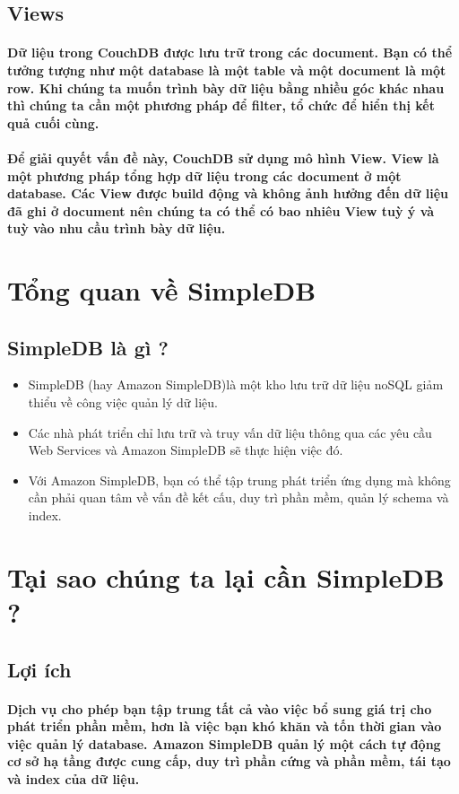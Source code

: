 		\subsection{Views}
			\paragraph{Dữ liệu trong CouchDB được lưu trữ trong các document. Bạn có thể tưởng tượng như một database là một table và một document là một row. Khi chúng ta muốn trình bày dữ liệu bằng nhiều góc khác nhau thì chúng ta cần một phương pháp để filter, tổ chức để hiển thị kết quả cuối cùng.}
			\paragraph{Để giải quyết vấn đề này, CouchDB sử dụng mô hình View. View là một phương pháp tổng hợp dữ liệu trong các document ở một database. Các View được build động và không ảnh hưởng đến dữ liệu đã ghi ở document nên chúng ta có thể có bao nhiêu View tuỳ ý và tuỳ vào nhu cầu trình bày dữ liệu.}
\section{Tổng quan về SimpleDB}
	\subsection{SimpleDB là gì ?}
		\begin{itemize}
			\item SimpleDB (hay Amazon SimpleDB)là một kho lưu trữ dữ liệu noSQL giảm thiểu về công việc quản lý dữ liệu.
			\item Các nhà phát triển chỉ lưu trữ và truy vấn dữ liệu thông qua các yêu cầu Web Services và Amazon SimpleDB sẽ thực hiện việc đó.
			\item Với Amazon SimpleDB, bạn có thể tập trung phát triển ứng dụng mà không cần phải quan tâm về vấn đề kết cấu, duy trì phần mềm, quản lý schema và index.
		\end{itemize}
\section{Tại sao chúng ta lại cần SimpleDB ?}
		\subsection{Lợi ích}
			\paragraph{Dịch vụ cho phép bạn tập trung tất cả vào việc bổ sung giá trị cho phát triển phần mềm, hơn là việc bạn khó khăn và tốn thời gian vào việc quản lý database. Amazon SimpleDB quản lý một cách tự động cơ sở hạ tầng được cung cấp, duy trì phần cứng và phần mềm, tái tạo và index của dữ liệu.}

